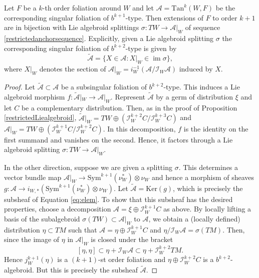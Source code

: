 \documentclass[10pt]{amsart}
\newcommand{\A}{{\mathcal{A}}}
\newcommand{\im}{\operatorname{im}}
\newcommand{\set}[1]{\lbrace #1\rbrace}
\numberwithin{theoremalpha}{section}
\numberwithin{equation}{section}
\numberwithin{definition}{section}
\numberwithin{theorem}{section}
\numberwithin{proposition}{section}
\numberwithin{lemma}{section}
\numberwithin{example}{section}
\numberwithin{remark}{section}
\numberwithin{corollary}{section}
\numberwithin{question}{section}
\numberwithin{problem}{section}
\numberwithin{assumption}{section}
\theoremstyle{named}
\numberwithin{equation}{section}
\begin{document}
\begin{theorem} \label{extensionbijpart1}
Let $F$ be a $k$-th order foliation around $W$ and let $\mathcal{A} = \mathrm{Tan}^{k}(W,F)$ be the corresponding singular foliation of $b^{k+1}$-type. Then extensions of $F$ to order $k+1$ are in bijection with Lie algebroid splittings $\sigma : TW \to \mathcal{A}|_{W}$ of sequence \eqref{restrictedanchorsequence}. 
Explicitly, given a Lie algebroid splitting $\sigma$ the corresponding singular foliation of $b^{k+2}$-type is given by
\begin{equation}\label{eq:elem}
\tilde{\mathcal{A}} = \set{X \in \A : X|_W \in \im \sigma},
\end{equation}
where $X|_W$ denotes the section of $\mathcal{A}|_{W} = i_{W}^{-1}(\mathcal{A}/\mathcal{I}_{W} \mathcal{A})$ induced by $X$.
\end{theorem}
\begin{proof}
Let $\tilde{\mathcal{A}} \subset \mathcal{A}$ be a subsingular foliation of $b^{k+2}$-type. This induces a Lie algebroid morphism $f: \tilde{\mathcal{A}}|_{W} \to \mathcal{A}|_{W}$. Represent $\tilde{\mathcal{A}}$ by a germ of distribution $\xi$ and let $C$ be a complementary distribution. Then, as in the proof of Proposition \ref{restrictedLiealgebroid}, $\tilde{\mathcal{A}}|_{W} = TW \oplus (\mathcal{I}_W^{k+2}C/\mathcal{I}_W^{k+3}C)$ and $\mathcal{A}|_{W} = TW \oplus  (\mathcal{I}_W^{k+1}C/\mathcal{I}_W^{k+2}C)$. In this decomposition, $f$ is the identity on the first summand and vanishes on the second. Hence, it factors through a Lie algebroid splitting $\sigma: TW \to \mathcal{A}|_{W}$. 

In the other direction, suppose we are given a splitting $\sigma$. This determines a vector bundle map $\mathcal{A}|_{W} \to \mathrm{Sym}^{k+1}(\nu_{W}^*) \otimes \nu_{W}$ and hence a morphism of sheaves $g: \mathcal{A} \to i_{W,*}(\mathrm{Sym}^{k+1}(\nu_{W}^*) \otimes \nu_{W})$. Let $\tilde{\mathcal{A}} = \mathrm{Ker}(g)$, which is precisely the subsheaf of Equation \eqref{eq:elem}. To show that this subsheaf has the desired properties, choose a decomposition $\mathcal{A} = \xi \oplus \mathcal{I}_W^{k+1}C$ as above. By locally lifting a basis of the subalgebroid $\sigma(TW) \subset \mathcal{A}|_{W}$ to $\mathcal{A}$, we obtain a (locally defined) distribution $\eta \subset TM$ such that  $\mathcal{A} = \eta \oplus \mathcal{I}_W^{k+1}C$ and $\eta/\mathcal{I}_W\mathcal{A} = \sigma(TM)$. Then, since the image of $\eta$ in $\mathcal{A}|_{W}$ is closed under the bracket
\[
[\eta, \eta] \subset \eta + \mathcal{I}_W \mathcal{A} \subset \eta + \mathcal{I}_W^{k+2}TM. 
\]
Hence $j_{W}^{k+1}(\eta)$ is a $(k+1)$-st order foliation and $\eta \oplus \mathcal{I}_W^{k+2}C$ is a $b^{k+2}$-algebroid. But this is precisely the subsheaf $\tilde{\mathcal{A}}$. 
\end{proof}
\end{document}
